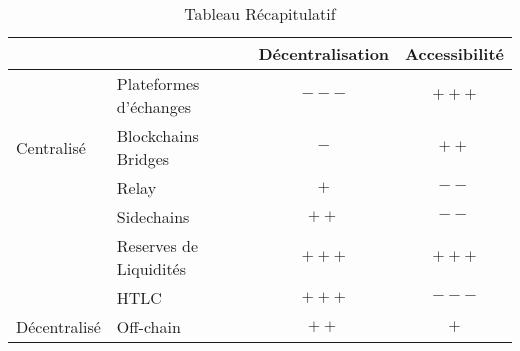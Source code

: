 \begin{table}[h!]
    \centering
    \caption{Tableau Récapitulatif}
    \begin{tabular}{|l|l|c|c|}
        \hline
                                   &                        & \multicolumn{1}{l}{Décentralisation}                   & \multicolumn{1}{l|}{Accessibilité}                  \\  \hline
                                   & Plateformes d'échanges & \cellcolor[HTML]{FD6864}$---$                          & \cellcolor[HTML]{9AFF99}$+++$      \\ \cline{2-4}
    \multirow{-2}{*}{Centralisé}   & Blockchains Bridges    & \cellcolor[HTML]{FD6864}$-$                            & \cellcolor[HTML]{9AFF99}$++$      \\ \hline
                                   & Relay                  & \cellcolor[HTML]{9AFF99}$+$                            & \cellcolor[HTML]{FD6864}$--$                              \\ \cline{2-4}
                                   & Sidechains             & \cellcolor[HTML]{9AFF99}$++$                           & \cellcolor[HTML]{FD6864}$--$                              \\ \cline{2-4}
                                   & Reserves de Liquidités & \cellcolor[HTML]{9AFF99}$+++$                          & \cellcolor[HTML]{9AFF99}$+++$      \\  \cline{2-4}
                                   & HTLC                   & \cellcolor[HTML]{9AFF99}$+++$                          & \cellcolor[HTML]{FD6864}$---$                             \\ \cline{2-4}
    \multirow{-5}{*}{Décentralisé} & Off-chain              & \cellcolor[HTML]{9AFF99}$++$                           & \cellcolor[HTML]{9AFF99}$+$       \\ \hline
    \end{tabular}
    \end{table}